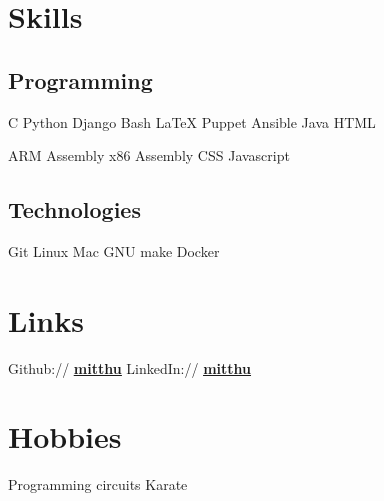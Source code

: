 \documentclass[]{deedy}
\newcommand{\linkstyle}[1]{\textbf{\ul{#1}}}
\let\oldhref\href
\renewcommand{\href}[2]{%
\oldhref{#1}{\linkstyle{#2}}%
}
\begin{document}
\begin{minipage}[t]{0.33\textwidth}
\section{Skills}
\subsection{Programming}
C \textbullet{} Python \textbullet{} Django \textbullet{} Bash \textbullet{} \LaTeX \textbullet{} Puppet \textbullet{} Ansible \textbullet{} Java \textbullet{} HTML
\sectionsep

ARM Assembly \textbullet{} x86 Assembly \textbullet{} CSS \textbullet{} Javascript
\sectionsep

\subsection{Technologies}
Git \textbullet{} Linux \textbullet{} Mac \textbullet{} GNU make \textbullet{} Docker %

\section{Links} 
Github:// \href{https://github.com/mitthu}{mitthu} \textbullet{} 
LinkedIn://  \href{https://www.linkedin.com/in/mitthu}{mitthu}

\section{Hobbies}
Programming circuits \textbullet{} Karate

\end{minipage}
\vrule{}
\hfill
\end{document}
